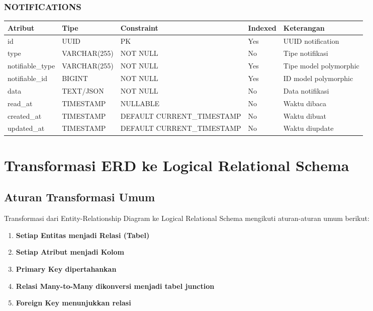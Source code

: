 \documentclass[12pt,a4paper]{article}
\begin{document}
\subsubsection{NOTIFICATIONS}
\begin{tabularx}{\textwidth}{|l|l|l|l|X|}
\hline
\textbf{Atribut} & \textbf{Tipe} & \textbf{Constraint} & \textbf{Indexed} & \textbf{Keterangan} \\
\hline
id & UUID & PK & Yes & UUID notification \\
\hline
type & VARCHAR(255) & NOT NULL & No & Tipe notifikasi \\
\hline
notifiable\_type & VARCHAR(255) & NOT NULL & Yes & Tipe model polymorphic \\
\hline
notifiable\_id & BIGINT & NOT NULL & Yes & ID model polymorphic \\
\hline
data & TEXT/JSON & NOT NULL & No & Data notifikasi \\
\hline
read\_at & TIMESTAMP & NULLABLE & No & Waktu dibaca \\
\hline
created\_at & TIMESTAMP & DEFAULT CURRENT\_TIMESTAMP & No & Waktu dibuat \\
\hline
updated\_at & TIMESTAMP & DEFAULT CURRENT\_TIMESTAMP & No & Waktu diupdate \\
\hline
\end{tabularx}

\newpage

\section{Transformasi ERD ke Logical Relational Schema}

\subsection{Aturan Transformasi Umum}

Transformasi dari Entity-Relationship Diagram ke Logical Relational Schema mengikuti aturan-aturan umum berikut:

\begin{enumerate}
    \item \textbf{Setiap Entitas menjadi Relasi (Tabel)}
    \item \textbf{Setiap Atribut menjadi Kolom}
    \item \textbf{Primary Key dipertahankan}
    \item \textbf{Relasi Many-to-Many dikonversi menjadi tabel junction}
    \item \textbf{Foreign Key menunjukkan relasi}
\end{enumerate}
\end{document}
